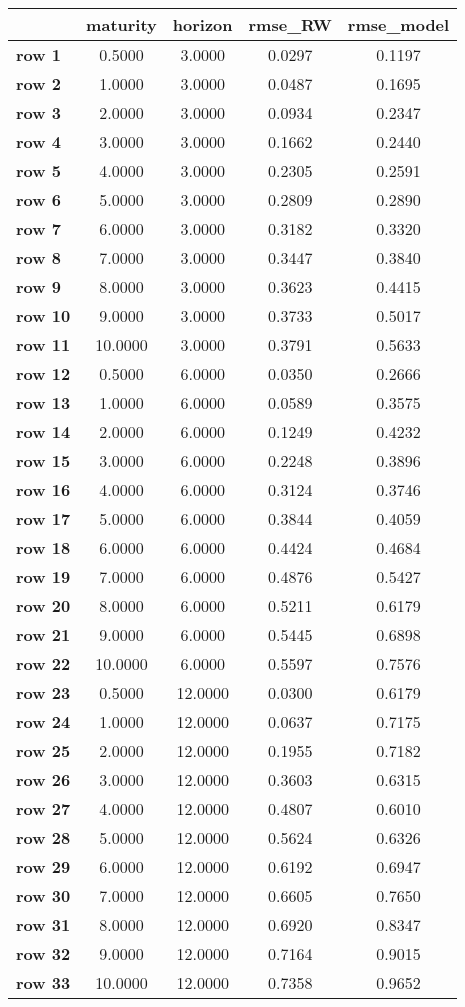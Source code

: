 \begin{tiny}\begin{tabular}{|l|c|c|c|c|}
\hline
&\textbf{maturity}&\textbf{horizon}&\textbf{rmse_RW}&\textbf{rmse_model}\\\hline
\textbf{row 1}&0.5000&3.0000&0.0297&0.1197\\\hline
\textbf{row 2}&1.0000&3.0000&0.0487&0.1695\\\hline
\textbf{row 3}&2.0000&3.0000&0.0934&0.2347\\\hline
\textbf{row 4}&3.0000&3.0000&0.1662&0.2440\\\hline
\textbf{row 5}&4.0000&3.0000&0.2305&0.2591\\\hline
\textbf{row 6}&5.0000&3.0000&0.2809&0.2890\\\hline
\textbf{row 7}&6.0000&3.0000&0.3182&0.3320\\\hline
\textbf{row 8}&7.0000&3.0000&0.3447&0.3840\\\hline
\textbf{row 9}&8.0000&3.0000&0.3623&0.4415\\\hline
\textbf{row 10}&9.0000&3.0000&0.3733&0.5017\\\hline
\textbf{row 11}&10.0000&3.0000&0.3791&0.5633\\\hline
\textbf{row 12}&0.5000&6.0000&0.0350&0.2666\\\hline
\textbf{row 13}&1.0000&6.0000&0.0589&0.3575\\\hline
\textbf{row 14}&2.0000&6.0000&0.1249&0.4232\\\hline
\textbf{row 15}&3.0000&6.0000&0.2248&0.3896\\\hline
\textbf{row 16}&4.0000&6.0000&0.3124&0.3746\\\hline
\textbf{row 17}&5.0000&6.0000&0.3844&0.4059\\\hline
\textbf{row 18}&6.0000&6.0000&0.4424&0.4684\\\hline
\textbf{row 19}&7.0000&6.0000&0.4876&0.5427\\\hline
\textbf{row 20}&8.0000&6.0000&0.5211&0.6179\\\hline
\textbf{row 21}&9.0000&6.0000&0.5445&0.6898\\\hline
\textbf{row 22}&10.0000&6.0000&0.5597&0.7576\\\hline
\textbf{row 23}&0.5000&12.0000&0.0300&0.6179\\\hline
\textbf{row 24}&1.0000&12.0000&0.0637&0.7175\\\hline
\textbf{row 25}&2.0000&12.0000&0.1955&0.7182\\\hline
\textbf{row 26}&3.0000&12.0000&0.3603&0.6315\\\hline
\textbf{row 27}&4.0000&12.0000&0.4807&0.6010\\\hline
\textbf{row 28}&5.0000&12.0000&0.5624&0.6326\\\hline
\textbf{row 29}&6.0000&12.0000&0.6192&0.6947\\\hline
\textbf{row 30}&7.0000&12.0000&0.6605&0.7650\\\hline
\textbf{row 31}&8.0000&12.0000&0.6920&0.8347\\\hline
\textbf{row 32}&9.0000&12.0000&0.7164&0.9015\\\hline
\textbf{row 33}&10.0000&12.0000&0.7358&0.9652\\\hline
\end{tabular}
\end{tiny}